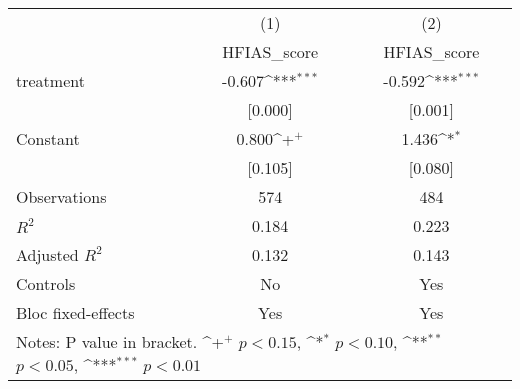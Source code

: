 {
\def\sym#1{\ifmmode^{#1}\else\(^{#1}\)\fi}
\begin{tabular*}{1.2\hsize}{@{\hskip\tabcolsep\extracolsep\fill}l*{2}{c}}
\cline{1-3}\cline{1-3}
     &\multicolumn{1}{c}{(1)}&\multicolumn{1}{c}{(2)}\\
     &\multicolumn{1}{c}{HFIAS\_score}&\multicolumn{1}{c}{HFIAS\_score}\\
\cline{1-3}
treatment&-0.607\sym{***}&-0.592\sym{***}\\
     &[0.000]         &[0.001]         \\
[1em]
Constant&0.800\sym{+}  &1.436\sym{*}  \\
     &[0.105]         &[0.080]         \\
\cline{1-3}
Observations&574         &484         \\
\(R^{2}\)&0.184         &0.223         \\
Adjusted \(R^{2}\)&0.132         &0.143         \\
Controls&No         &Yes         \\
Bloc fixed-effects&Yes         &Yes         \\
\cline{1-3}\cline{1-3}
\multicolumn{3}{p{1.0\textwidth}}{\footnotesize Notes: P value in bracket. \sym{+} \(p<0.15\), \sym{*} \(p<0.10\), \sym{**} \(p<0.05\), \sym{***} \(p<0.01\)}\\
\end{tabular*}
}
